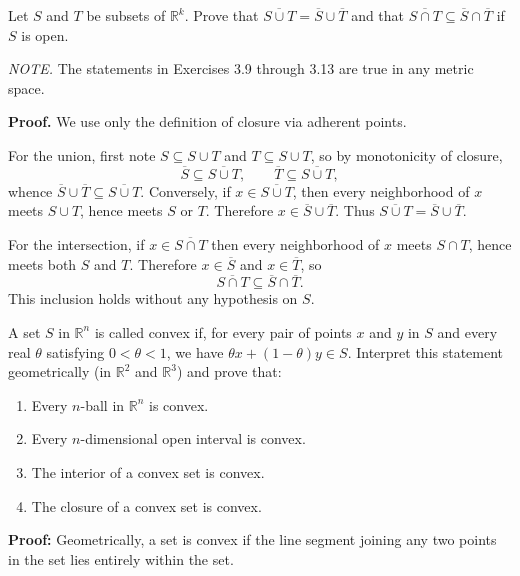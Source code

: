 \begin{problembox}

Let $S$ and $T$ be subsets of $\mathbb{R}^k$. Prove that $\overline{S \cup T} = \overline{S} \cup \overline{T}$ and that $\overline{S \cap T} \subseteq \overline{S} \cap \overline{T}$ if $S$ is open.

\textit{NOTE.} The statements in Exercises 3.9 through 3.13 are true in any metric space.
\end{problembox}

\textbf{Proof.}
We use only the definition of closure via adherent points.

For the union, first note $S\subseteq S\cup T$ and $T\subseteq S\cup T$, so by monotonicity of closure,
\[\overline S\subseteq \overline{S\cup T},\qquad \overline T\subseteq \overline{S\cup T},\]
whence $\overline S\cup\overline T\subseteq \overline{S\cup T}$. Conversely, if $x\in \overline{S\cup T}$, then every neighborhood of $x$ meets $S\cup T$, hence meets $S$ or $T$. Therefore $x\in\overline S\cup\overline T$. Thus $\overline{S\cup T}=\overline S\cup\overline T$.

For the intersection, if $x\in \overline{S\cap T}$ then every neighborhood of $x$ meets $S\cap T$, hence meets both $S$ and $T$. Therefore $x\in\overline S$ and $x\in\overline T$, so
\[\overline{S\cap T}\subseteq \overline S\cap \overline T.\]
This inclusion holds without any hypothesis on $S$.

\begin{problembox}
A set \( S \) in \( \mathbb{R}^n \) is called convex if, for every pair of points \( x \) and \( y \) in \( S \) and every real \( \theta \) satisfying \( 0 < \theta < 1 \), we have \( \theta x + (1 - \theta)y \in S \). Interpret this statement geometrically (in \( \mathbb{R}^2 \) and \( \mathbb{R}^3 \)) and prove that:
\begin{enumerate}[label=\alph*)]
\item Every \( n \)-ball in \( \mathbb{R}^n \) is convex.
\item Every \( n \)-dimensional open interval is convex.
\item The interior of a convex set is convex.
\item The closure of a convex set is convex.
\end{enumerate}
\end{problembox}

\textbf{Proof:} Geometrically, a set is convex if the line segment joining any two points in the set lies entirely within the set.

